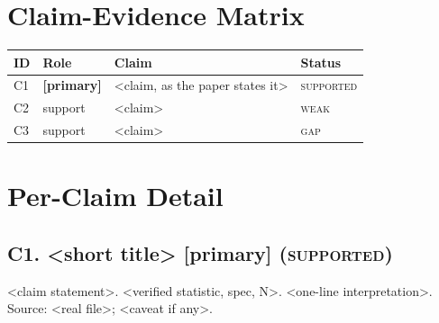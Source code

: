 \documentclass[11pt]{article}
\newcommand{\status}[1]{\textsc{#1}}
\newcommand{\supported}{\textcolor{green!50!black}{\status{supported}}}
\newcommand{\weak}{\textcolor{orange!80!black}{\status{weak}}}
\newcommand{\gap}{\textcolor{red!70!black}{\status{gap}}}
\begin{document}
\section*{Claim-Evidence Matrix}

\begin{small}
\begin{tabularx}{\textwidth}{@{}p{}p{}X p{}@{}}
\toprule
ID & Role & Claim & Status \\
\midrule
C1 & \textbf{[primary]} & <claim, as the paper states it> & \supported \\
\addlinespace
C2 & support & <claim> & \weak \\
\addlinespace
C3 & support & <claim> & \gap \\
\bottomrule
\end{tabularx}
\end{small}

\section*{Per-Claim Detail}

\subsection*{C1. <short title> [primary] (\supported)}

<claim statement>.
%
<verified statistic, spec, N>.
%
<one-line interpretation>.
%
Source: <real file>; <caveat if any>.
\end{document}
